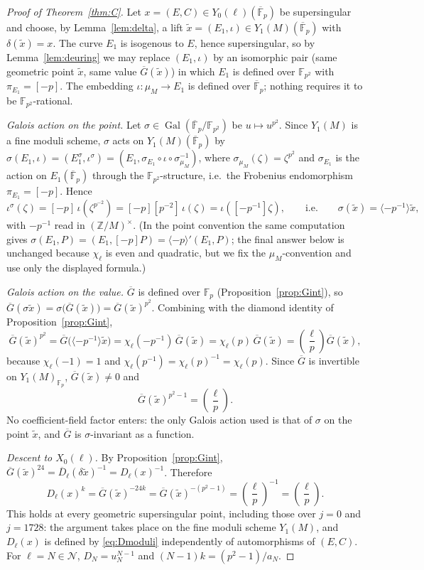 \documentclass[11pt,a4paper]{article}
\numberwithin{equation}{section}
\theoremstyle{definition}
\theoremstyle{remark}
\newcommand{\Fp}{\mathbb F_p}
\newcommand{\Fq}{\mathbb F_{p^2}}
\newcommand{\Fb}{\overline{\mathbb F}_p}
\newcommand{\Z}{\mathbb Z}
\newcommand{\leg}[2]{\left(\frac{#1}{#2}\right)}
\begin{document}
\begin{proof}[Proof of Theorem~\ref{thm:C}]
Let $x=(E,C)\in Y_0(\ell)(\Fb)$ be supersingular and choose, by Lemma~\ref{lem:delta}, a lift
$\tilde x=(E_1,\iota)\in Y_1(M)(\Fb)$ with $\delta(\tilde x)=x$. The curve $E_1$ is isogenous to $E$,
hence supersingular, so by Lemma~\ref{lem:deuring} we may replace $(E_1,\iota)$ by an isomorphic
pair (same geometric point $\tilde x$, same value $\overline G(\tilde x)$) in which $E_1$ is defined
over $\Fq$ with $\pi_{E_1}=[-p]$. The embedding $\iota:\mu_M\to E_1$ is defined over $\Fb$; nothing
requires it to be $\Fq$-rational.

\emph{Galois action on the point.} Let $\sigma\in\operatorname{Gal}(\Fb/\Fq)$ be $u\mapsto u^{p^2}$.
Since $Y_1(M)$ is a fine moduli scheme, $\sigma$ acts on $Y_1(M)(\Fb)$ by
$\sigma(E_1,\iota)=(E_1^\sigma,\iota^\sigma)=(E_1,\sigma_{E_1}\circ\iota\circ\sigma_{\mu_M}^{-1})$,
where $\sigma_{\mu_M}(\zeta)=\zeta^{p^2}$ and $\sigma_{E_1}$ is the action on $E_1(\Fb)$ through the
$\Fq$-structure, i.e.\ the Frobenius endomorphism $\pi_{E_1}=[-p]$. Hence
\[
\iota^\sigma(\zeta)=[-p]\,\iota(\zeta^{p^{-2}})=[-p][p^{-2}]\,\iota(\zeta)=\iota([-p^{-1}]\zeta),
\qquad\text{i.e.}\qquad \sigma(\tilde x)=\langle -p^{-1}\rangle\tilde x,
\]
with $-p^{-1}$ read in $(\Z/M)^\times$. (In the point convention the same computation gives
$\sigma(E_1,P)=(E_1,[-p]P)=\langle-p\rangle'(E_1,P)$; the final answer below is unchanged because
$\chi_\ell$ is even and quadratic, but we fix the $\mu_M$-convention and use only the displayed formula.)

\emph{Galois action on the value.} $\overline G$ is defined over $\Fp$
(Proposition~\ref{prop:Gint}), so $\overline G(\sigma\tilde x)=\sigma\bigl(\overline G(\tilde x)\bigr)
=\overline G(\tilde x)^{p^2}$. Combining with the diamond identity of Proposition~\ref{prop:Gint},
\[
\overline G(\tilde x)^{p^2}=\overline G\bigl(\langle-p^{-1}\rangle\tilde x\bigr)
=\chi_\ell(-p^{-1})\,\overline G(\tilde x)=\chi_\ell(p)\,\overline G(\tilde x)=\leg{\ell}{p}\overline G(\tilde x),
\]
because $\chi_\ell(-1)=1$ and $\chi_\ell(p^{-1})=\chi_\ell(p)^{-1}=\chi_\ell(p)$. Since
$\overline G$ is invertible on $Y_1(M)_{\Fp}$, $\overline G(\tilde x)\ne0$ and
\begin{equation}\label{eq:Gfrob}
\overline G(\tilde x)^{p^2-1}=\leg{\ell}{p}.
\end{equation}
No coefficient-field factor enters: the only Galois action used is that of $\sigma$ on the point
$\tilde x$, and $\overline G$ is $\sigma$-invariant as a function.

\emph{Descent to $X_0(\ell)$.} By Proposition~\ref{prop:Gint},
$\overline G(\tilde x)^{24}=\overline D_\ell(\delta\tilde x)^{-1}=D_\ell(x)^{-1}$. Therefore
\[
D_\ell(x)^{k}=\overline G(\tilde x)^{-24k}=\overline G(\tilde x)^{-(p^2-1)}=\leg{\ell}{p}^{-1}=\leg{\ell}{p}.
\]
This holds at every geometric supersingular point, including those over $j=0$ and $j=1728$: the
argument takes place on the fine moduli scheme $Y_1(M)$, and $D_\ell(x)$ is defined by
\eqref{eq:Dmoduli} independently of automorphisms of $(E,C)$. For $\ell=N\in\mathcal N$,
$D_N=u_N^{N-1}$ and $(N-1)k=(p^2-1)/a_N$.
\end{proof}
\end{document}
